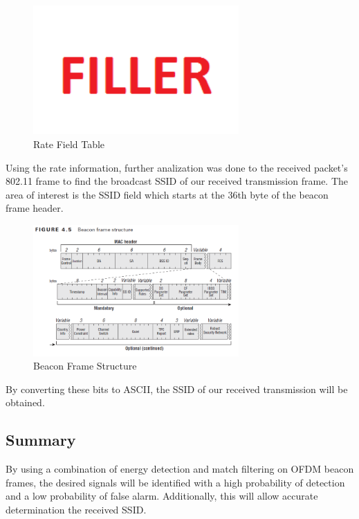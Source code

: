 \begin{figure}[ht!]
	\centering
	\includegraphics[width=0.70\textwidth]{img/filler}
	\caption{Rate Field Table}
	\label{fig:ofdm_rate_table}
\end{figure}\par
Using the rate information, further analization was done to the received packet’s 802.11 frame to find the broadcast SSID of our received transmission frame. The area of interest is the SSID field which starts at the 36th byte of the beacon frame header. 
\begin{figure}[ht!]
	\centering
	\includegraphics[width=0.70\textwidth]{img/beacon_frame}
	\caption{Beacon Frame Structure}
	\label{fig:beacon_frame}
\end{figure}\par
By converting these bits to ASCII, the SSID of our received transmission will be obtained.

\subsection{Summary}
By using a combination of energy detection and match filtering on OFDM beacon frames,  the desired signals will be identified  with a high probability of detection and a low probability of false alarm. Additionally, this will allow accurate determination the received SSID.

